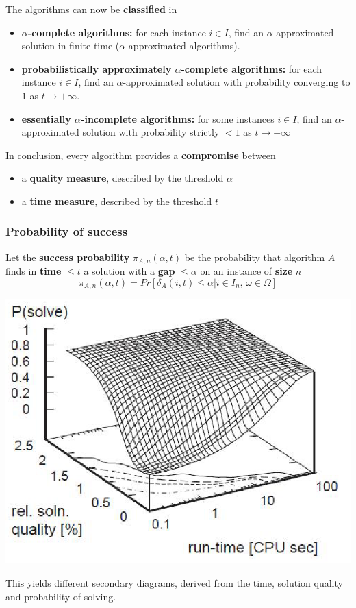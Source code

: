 \documentclass[11pt]{article}
\begin{document}
	The algorithms can now be \textbf{classified} in
	\begin{itemize}
		\item \textbf{$\alpha$-complete algorithms:} for each instance $i \in I$, find an $\alpha$-approximated solution in finite time ($\alpha$-approximated algorithms).\\
		
		\item \textbf{probabilistically approximately $\alpha$-complete algorithms:} for each instance $i \in I$, find an $\alpha$-approximated solution with probability converging to $1$ as $t \rightarrow + \infty$.\\
		
		\item \textbf{essentially $\alpha$-incomplete algorithms:} for some instances $i \in I$, find an $\alpha$-approximated solution with probability strictly $< 1$ as $t \rightarrow +\infty$
	\end{itemize}
	
	In conclusion, every algorithm provides a \textbf{compromise} between
	\begin{itemize}
		\item a \textbf{quality measure}, described by the threshold $\alpha$
		\item a \textbf{time measure}, described by the threshold $t$
	\end{itemize}
	
	\newpage
	
	\subsubsection{Probability of success}
	Let the \textbf{success probability} $\pi_{A, n} (\alpha, t)$ be the probability that algorithm $A$ finds in \textbf{time} $\leq t$ a solution with a \textbf{gap} $\leq \alpha$ on an instance of \textbf{size} $n$
	$$ \pi_{A, n} (\alpha, t) = Pr \left[\delta_A (i, t) \leq \alpha | i \in I_n, \, \omega \in \Omega \right]$$
	\begin{center}
		\includegraphics[width=0.7\columnwidth]{img/Psucc1}
	\end{center}
	This yields different secondary diagrams, derived from the time, solution quality and probability of solving.\\
	
\end{document}
